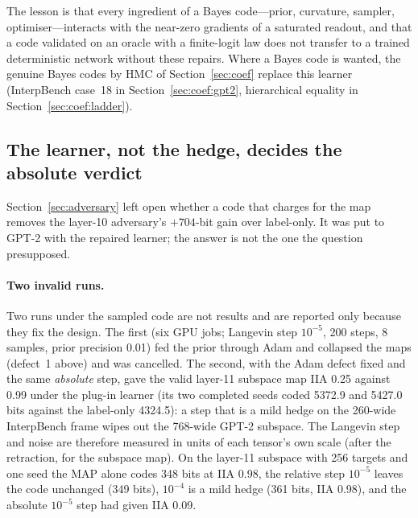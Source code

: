\documentclass[11pt,a4paper]{article}
\begin{document}
The lesson is that every ingredient of a Bayes code---prior, curvature, sampler, optimiser---interacts with the near-zero gradients of a saturated readout, and that a code validated on an oracle with a finite-logit law does not transfer to a trained deterministic network without these repairs. Where a Bayes code is wanted, the genuine Bayes codes by HMC of Section~\ref{sec:coef} replace this learner (InterpBench case~18 in Section~\ref{sec:coef:gpt2}, hierarchical equality in Section~\ref{sec:coef:ladder}).

\subsection{The learner, not the hedge, decides the absolute verdict}
\label{sec:learner}

Section~\ref{sec:adversary} left open whether a code that charges for the map removes the layer-10 adversary's $+704$-bit gain over label-only. It was put to GPT-2 with the repaired learner; the answer is not the one the question presupposed.

\paragraph{Two invalid runs.} Two runs under the sampled code are not results and are reported only because they fix the design. The first (six GPU jobs; Langevin step $10^{-5}$, 200 steps, 8 samples, prior precision 0.01) fed the prior through Adam and collapsed the maps (defect~1 above) and was cancelled. The second, with the Adam defect fixed and the same \emph{absolute} step, gave the valid layer-11 subspace map IIA 0.25 against 0.99 under the plug-in learner (its two completed seeds coded 5372.9 and 5427.0 bits against the label-only 4324.5): a step that is a mild hedge on the 260-wide InterpBench frame wipes out the 768-wide GPT-2 subspace. The Langevin step and noise are therefore measured in units of each tensor's own scale (after the retraction, for the subspace map). On the layer-11 subspace with 256 targets and one seed the MAP alone codes 348 bits at IIA 0.98, the relative step $10^{-5}$ leaves the code unchanged (349 bits), $10^{-4}$ is a mild hedge (361 bits, IIA 0.98), and the absolute $10^{-5}$ step had given IIA 0.09.
\end{document}
